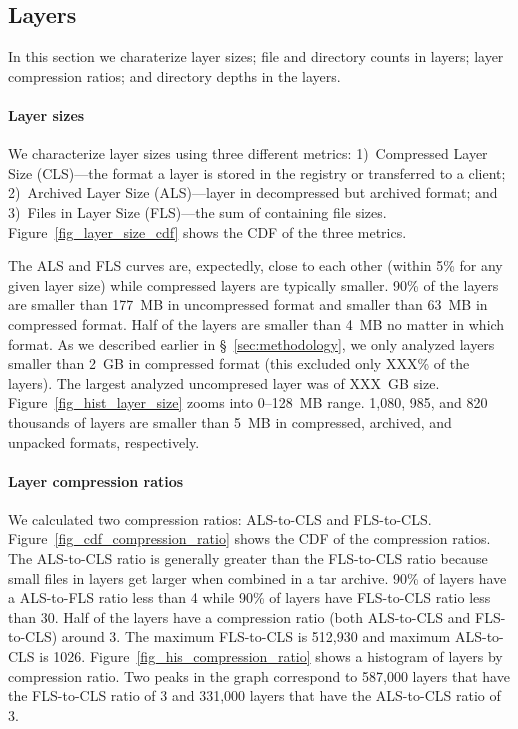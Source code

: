 \subsection{Layers}
\label{sec:layers}

In this section we charaterize layer sizes; file and directory counts in
layers; layer compression ratios; and directory depths in the layers.




\paragraph{Layer sizes}
%
We characterize layer sizes using three different metrics:
%
1)~Compressed Layer Size (CLS)---the format a layer is stored in the registry or
transferred to a client;
%
2)~Archived Layer Size (ALS)---layer in decompressed but archived format;
%
and 3)~Files in Layer Size (FLS)---the sum of containing file sizes.
%
Figure~\ref{fig_layer_size_cdf} shows the CDF of the three metrics.

The ALS and FLS curves are, expectedly, close to each other (within 5\% for
any given layer size) while compressed layers are typically smaller.
90\% of the layers are smaller than 177~MB in uncompressed 
format and smaller than 63~MB in compressed format.
%
Half of the layers are smaller than 4~MB no matter in which format.
%
As we described earlier in \S~\ref{sec:methodology}, we only
analyzed layers smaller than 2~GB in compressed format (this
excluded only XXX\% of the layers).
%
%
The largest analyzed uncompresed layer
was of XXX~GB size.
%
Figure~\ref{fig_hist_layer_size} zooms into 0--128~MB range.
%
1,080, 985, and 820 thousands of layers are smaller than 5~MB
in compressed, archived, and unpacked formats, respectively.
%




\paragraph{Layer compression ratios}
%
We calculated two compression ratios: ALS-to-CLS and FLS-to-CLS.
Figure~\ref{fig_cdf_compression_ratio} shows the CDF of the compression ratios.
%
The ALS-to-CLS ratio is generally greater than the FLS-to-CLS ratio
because small files in layers get larger when combined in a tar archive.
%
90\% of layers have a  ALS-to-FLS ratio less than 4 while 90\% of
layers have FLS-to-CLS ratio less than 30.
%
Half of the layers have a compression ratio (both ALS-to-CLS and
FLS-to-CLS) around 3.
%
The maximum FLS-to-CLS is 512,930 and maximum ALS-to-CLS is 1026.
%
Figure~\ref{fig_his_compression_ratio} shows a histogram of layers by
compression ratio.
%
Two peaks in the graph correspond to 587,000 layers that have the FLS-to-CLS ratio of 3
and 331,000 layers that have the ALS-to-CLS ratio of 3.

